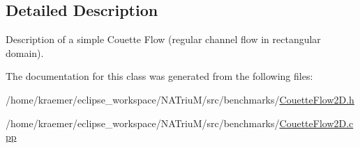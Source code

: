 \subsection{\-Detailed \-Description}
\-Description of a simple \-Couette \-Flow (regular channel flow in rectangular domain). 

\-The documentation for this class was generated from the following files\-:\begin{DoxyCompactItemize}
\item 
/home/kraemer/eclipse\-\_\-workspace/\-N\-A\-Triu\-M/src/benchmarks/\hyperlink{CouetteFlow2D_8h}{\-Couette\-Flow2\-D.\-h}\item 
/home/kraemer/eclipse\-\_\-workspace/\-N\-A\-Triu\-M/src/benchmarks/\hyperlink{CouetteFlow2D_8cpp}{\-Couette\-Flow2\-D.\-cpp}\end{DoxyCompactItemize}

